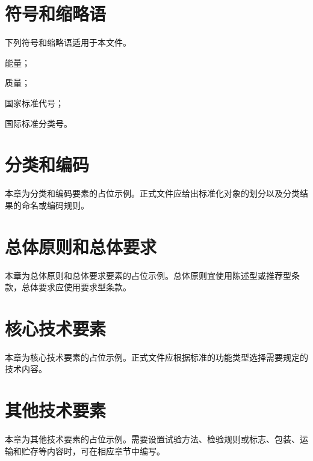 \chapter{符号和缩略语}
下列符号和缩略语适用于本文件。
\begin{stdsymbols}
    \item[$E$] 能量；
    \item[$m$] 质量；
    \item[GB] 国家标准代号；
    \item[ICS] 国际标准分类号。
\end{stdsymbols}

\chapter{分类和编码}
本章为分类和编码要素的占位示例。正式文件应给出标准化对象的划分以及分类结果的命名或编码规则。

\chapter{总体原则和总体要求}
本章为总体原则和总体要求要素的占位示例。总体原则宜使用陈述型或推荐型条款，总体要求应使用要求型条款。

\chapter{核心技术要素}
本章为核心技术要素的占位示例。正式文件应根据标准的功能类型选择需要规定的技术内容。

\chapter{其他技术要素}
本章为其他技术要素的占位示例。需要设置试验方法、检验规则或标志、包装、运输和贮存等内容时，可在相应章节中编写。
